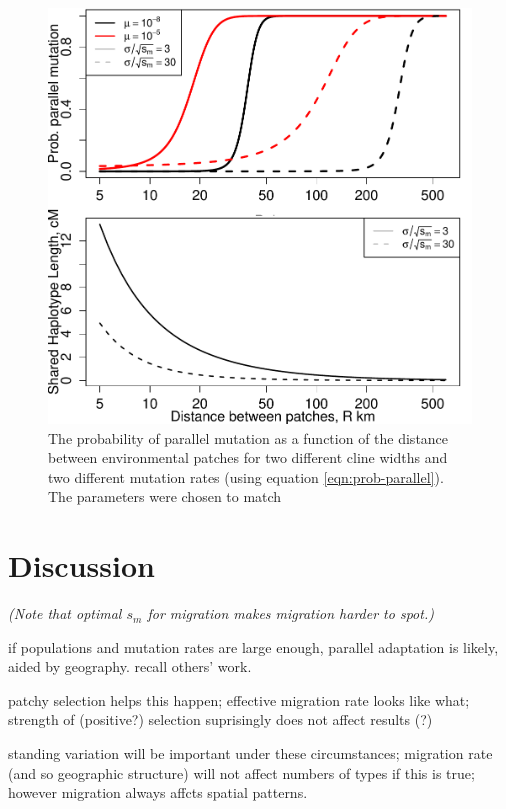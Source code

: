 \documentclass{article}
\newcommand{\plr}[1]{{\it\color{blue}(#1)}}
\begin{document}
\begin{figure}[ht]
  \begin{center}
    \includegraphics{Lava_flow_mice_prob_parallel}
  \end{center}
  \caption{
The probability of parallel mutation as a function of the distance
between environmental patches for two different cline widths
and two different mutation rates (using equation \eqref{eqn:prob-parallel}). 
The parameters were chosen to match  
  \label{fig:mice_prob_parallel}
  }
\end{figure}


\section{Discussion} 

\plr{Note that optimal $s_m$ for migration makes migration harder to spot.}

if populations and mutation rates are large enough, parallel adaptation is likely, aided by geography. 
recall others' work. 

patchy selection helps this happen; 
effective migration rate looks like what; 
strength of (positive?) selection suprisingly does not affect results (?) 

standing variation will be important under these circumstances; 
migration rate (and so geographic structure) will not affect numbers of types if this is true; 
however migration always affcts spatial patterns. 
\end{document}
